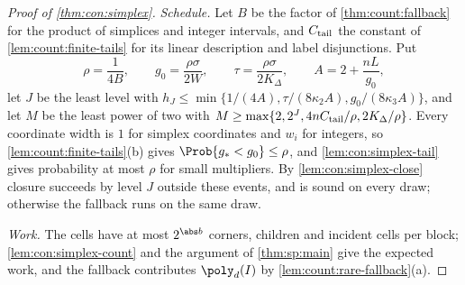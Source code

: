 \begin{proof}[Proof of \cref{thm:con:simplex}]
\emph{Schedule.} Let $B$ be the factor of \cref{thm:count:fallback} for the
product of simplices and integer intervals, and $C_{\rm tail}$ the constant of
\cref{lem:count:finite-tails} for its linear description and label
disjunctions. Put
\[
 \rho=\frac1{4B},\qquad g_0=\frac{\rho\sigma}{2W},\qquad
 \tau=\frac{\rho\sigma}{2K_\Delta},\qquad A=2+\frac{nL}{g_0},
\]
let $J$ be the least level with
$h_J\le\min\{1/(4A),\tau/(8\kappa_2A),g_0/(8\kappa_3A)\}$, and let $M$ be the
least power of two with $M\ge\max\{2,2^J,4nC_{\rm tail}/\rho,2K_\Delta/\rho\}$.
Every
coordinate width is $1$ for simplex coordinates and $w_i$ for integers, so
\cref{lem:count:finite-tails}(b) gives $\Prob\{g_*<g_0\}\le\rho$, and
\cref{lem:con:simplex-tail} gives probability at most $\rho$ for small
multipliers. By \cref{lem:con:simplex-close} closure succeeds by level $J$
outside these events, and is sound on every draw; otherwise the fallback
runs on the same draw.

\emph{Work.} The cells have at most $2^{\abs b}$ corners, children and
incident cells per block; \cref{lem:con:simplex-count} and the argument of
\cref{thm:sp:main} give the expected work, and the fallback contributes
$\poly_d(I)$ by \cref{lem:count:rare-fallback}(a).


\end{proof}
